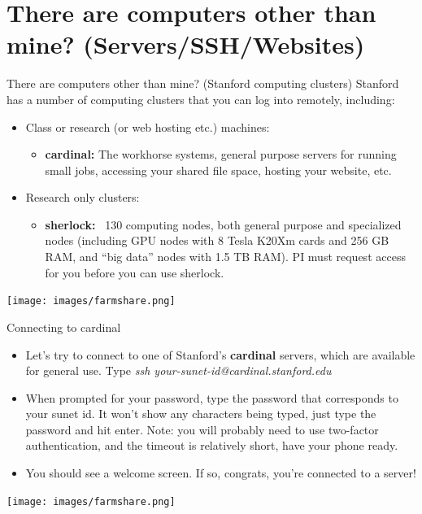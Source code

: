 \documentclass{beamer}
\begin{document}
\section{There are computers other than mine? (Servers/SSH/Websites)}
\begin{frame}{There are computers other than mine? (Stanford computing clusters)}
Stanford has a number of computing clusters that you can log into remotely, including:
\begin{itemize}
    \item Class or research (or web hosting etc.) machines:
    \begin{itemize}
	\item<1-> \textbf{cardinal:} The workhorse systems, general purpose servers for running small jobs, accessing your shared file space, hosting your website, etc.
    \end{itemize}
    \item<2-> Research only clusters:
    \begin{itemize}
	\item<2-> \textbf{sherlock:} ~130 computing nodes, both general purpose and specialized nodes (including GPU nodes with 8 Tesla K20Xm cards and 256 GB RAM, and ``big data'' nodes with 1.5 TB RAM). {\color{red} PI must request access for you before you can use sherlock.}
    \end{itemize}
\end{itemize}
\begin{center}\vspace{0em}\texttt{[image: images/farmshare.png]}\end{center}
\end{frame}

\begin{frame}{Connecting to cardinal}
\begin{itemize}
    \item<1-> Let's try to connect to one of Stanford's \textbf{cardinal} servers, which are available for general use. Type \emph{ssh your-sunet-id@cardinal.stanford.edu}
    \item<1-> When prompted for your password, type the password that corresponds to your sunet id. It won't show any characters being typed, just type the password and hit enter. Note: you will probably need to use two-factor authentication, and the timeout is relatively short, have your phone ready.
    \item<2-> You should see a welcome screen. If so, congrats, you're connected to a server!
\end{itemize}
\begin{center}\vspace{0em}\texttt{[image: images/farmshare.png]}\end{center}
\end{frame}
\end{document}
